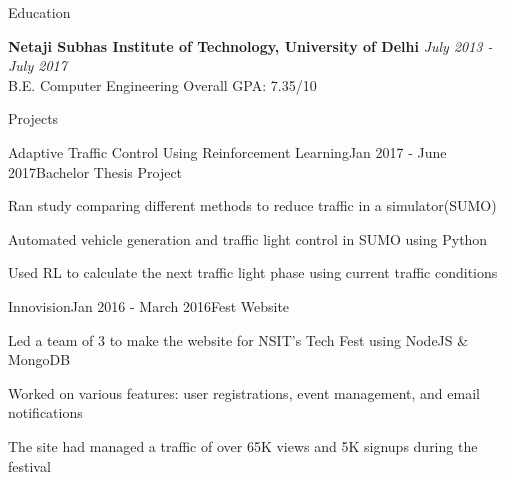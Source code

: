 \documentclass{resume} %
\begin{document}

\begin{rSection}{Education}

{\bf Netaji Subhas Institute of Technology, University of Delhi} \hfill {\em July 2013 - July 2017} 
\\ B.E. Computer Engineering \hfill { Overall GPA: 7.35/10}

\end{rSection}

\begin{rSection}{Projects}

\begin{rSubsection}
{Adaptive Traffic Control Using Reinforcement Learning}{Jan 2017 - June 2017}{Bachelor Thesis Project}{}
\item Ran study comparing different methods to reduce traffic in a simulator(SUMO)
\item Automated vehicle generation and traffic light control in SUMO using Python
\item Used RL to calculate the next traffic light phase using current traffic conditions
\end{rSubsection}

\begin{rSubsection}
{Innovision}{Jan 2016 - March 2016}{Fest Website}{}
\item Led a team of 3 to make the website for NSIT’s Tech Fest using NodeJS \& MongoDB
\item Worked on various features: user registrations, event management, and email notifications
\item The site had managed a traffic of over 65K views and 5K signups during the festival
\end{rSubsection}

\end{rSection}
\end{document}
